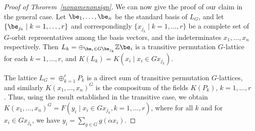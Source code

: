 \documentclass[12pt]{article}
\theoremstyle{plain}
\newcommand{\Z}{\ensuremath{\mathbb{Z}}}
\begin{document}
\begin{proof}[Proof of Theorem~\ref{nonamenonsign}]
  \medskip 
  
  We can now give the proof of our claim in the general case.  Let
  $\be_1, \ldots , \be_n$ be the standard basis of $L_G$, and let
  $\{\be_{j_k} \mid k = 1, \ldots, r\}$ and correspondingly $\{x_{j_k}
  \mid k = 1, \ldots, r\}$ be a complete set of $G$-orbit
  representatives among the basis vectors, and the indeterminates
  $x_1, \ldots, x_n$ respectively. Then $L_k = \oplus_{ \be_i \in G
    \be_{j_{k}} } \Z \be_i$ is a transitive permutation $G$-lattice
  for each $k = 1, \ldots, r$, and $K(L_k) = K(x_i \mid x_i \in
  Gx_{j_k})$.
  
  The lattice $L_G = \oplus^r_{k =1} P_k$ is a direct sum of transitive
  permutation $G$-lattices, and similarly $K(x_1,\dots,x_n)^G$ is the
  compositum of the fields $K(P_k)$, $k=1,\dots,r$. Thus, using the 
  result established in the transitive case, we obtain
  $K(x_1,\dots,x_n)^G=F(y_i \mid x_i \in Gx_{j_k}, k=1,\dots,r)$, where
  for all $k$ and for $x_i \in Gx_{j_k}$, we have $y_i=\sum_{g \in G}
  g(\alpha x_i)$.
\end{proof}
\end{document}
